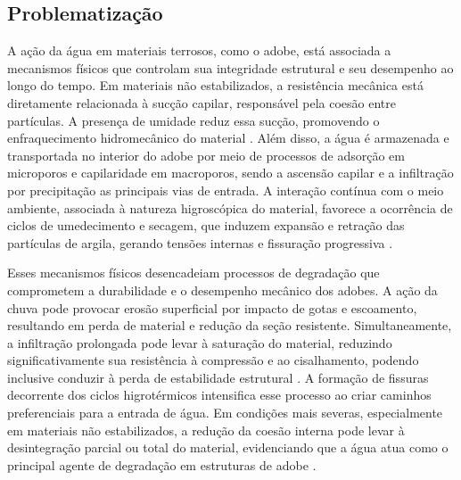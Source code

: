 
\subsection{Problematização}



    A ação da água em materiais terrosos, como o adobe, está associada a mecanismos físicos que controlam sua integridade estrutural e seu desempenho ao longo do tempo. Em materiais não estabilizados, a resistência mecânica está diretamente relacionada à sucção capilar, responsável pela coesão entre partículas. A presença de umidade reduz essa sucção, promovendo o enfraquecimento hidromecânico do material \cite{Gerard2015, Beckett2020, Bui2014}. Além disso, a água é armazenada e transportada no interior do adobe por meio de processos de adsorção em microporos e capilaridade em macroporos, sendo a ascensão capilar e a infiltração por precipitação as principais vias de entrada. A interação contínua com o meio ambiente, associada à natureza higroscópica do material, favorece a ocorrência de ciclos de umedecimento e secagem, que induzem expansão e retração das partículas de argila, gerando tensões internas e fissuração progressiva \cite{Gerard2015, Dieudonne2016, Beckett2020, Bui2014}.
    

    Esses mecanismos físicos desencadeiam processos de degradação que comprometem a durabilidade e o desempenho mecânico dos adobes. A ação da chuva pode provocar erosão superficial por impacto de gotas e escoamento, resultando em perda de material e redução da seção resistente. Simultaneamente, a infiltração prolongada pode levar à saturação do material, reduzindo significativamente sua resistência à compressão e ao cisalhamento, podendo inclusive conduzir à perda de estabilidade estrutural \cite{Gerard2015, Bui2014}. A formação de fissuras decorrente dos ciclos higrotérmicos intensifica esse processo ao criar caminhos preferenciais para a entrada de água. Em condições mais severas, especialmente em materiais não estabilizados, a redução da coesão interna pode levar à desintegração parcial ou total do material, evidenciando que a água atua como o principal agente de degradação em estruturas de adobe \cite{Beckett2020, Ratchakrom2021, Guettatfi2021}. 
    
